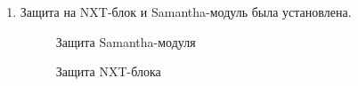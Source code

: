 \begin{enumerate}
\begin{enumerate}
		\item Защита на NXT-блок и Samantha-модуль была установлена.
		\begin{figure}[H]
		  \begin{minipage}[h]{0.47\linewidth}
			\caption{Защита Samantha-модуля}
		  \end{minipage}
		  \hfill
		  \begin{minipage}[h]{0.6\linewidth}
			\caption{Защита NXT-блока}
		  \end{minipage}
	    \end{figure}
		

\end{enumerate}
\end{enumerate}
